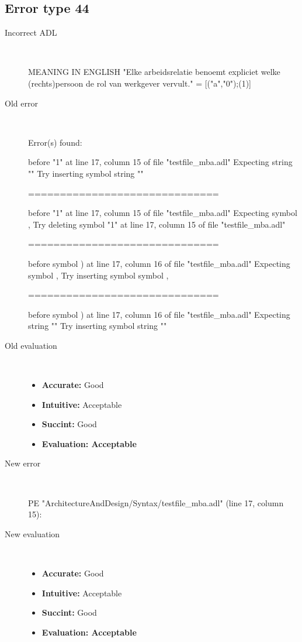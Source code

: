 \subsection{Error type 44}
  \begin{description}
  \item[Incorrect ADL]~\\
\begin{adl}
MEANING IN ENGLISH "Elke arbeidsrelatie benoemt expliciet welke (rechts)persoon de rol van werkgever vervult."
= [("a","0");(1)] \end{adl}
  \item[Old error]~\\
\begin{haskell}
Error(s) found:

before "1" at line 17, column 15 of file "testfile_mba.adl"
Expecting string ""
Try inserting symbol string ""

==============================

before "1" at line 17, column 15 of file "testfile_mba.adl"
Expecting symbol ,
Try deleting symbol "1" at line 17, column 15 of file "testfile_mba.adl"

==============================

before symbol ) at line 17, column 16 of file "testfile_mba.adl"
Expecting symbol ,
Try inserting symbol symbol ,

==============================

before symbol ) at line 17, column 16 of file "testfile_mba.adl"
Expecting string ""
Try inserting symbol string ""
\end{haskell}
  \item[Old evaluation]~\\
    \begin{itemize}
    \item \textbf{Accurate:} Good
    \item \textbf{Intuitive:} Acceptable
    \item \textbf{Succint:} Good
    \item \textbf{Evaluation: Acceptable}
    \end{itemize}
  \item[New error]~\\
\begin{haskell}
PE "ArchitectureAndDesign/Syntax/testfile_mba.adl" (line 17, column 15):\end{haskell}
  \item[New evaluation]~\\
    \begin{itemize}
    \item \textbf{Accurate:} Good
    \item \textbf{Intuitive:} Acceptable
    \item \textbf{Succint:} Good
    \item \textbf{Evaluation: Acceptable
}
    \end{itemize}
  \end{description}

